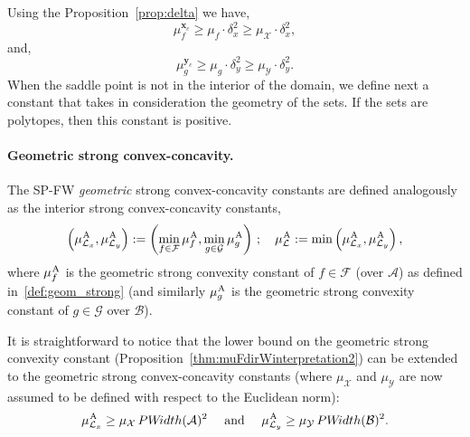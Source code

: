\documentclass[twoside]{article}
\renewcommand{\L}{\mathcal{L}}
\newcommand{\X}{\mathcal{X}}
\newcommand{\Y}{\mathcal{Y}}
\newcommand{\x}{\bm{x}}
\newcommand{\y}{\bm{y}}
\newcommand{\away}{{\hspace{0.05em}\textnormal{A}}}
\newcommand{\A}{\mathcal{A}}
\newcommand{\B}{\mathcal{B}}
\newcommand{\PWidth}{\mathop{PW\!idth}}
\newcommand{\xc}{\x_c} %
\newcommand{\yc}{\y_c} %
\newcommand{\0}{\mathbf{0}} %
\begin{document}
  \proof 
     Using the Proposition~\ref{prop:delta} we have, 
      \begin{equation}
        \mu^{\xc}_f \geq \mu_f \cdot \delta_x^2 \geq \mu_\X\cdot \delta_x^2,
      \end{equation}
     and,
        \begin{equation}
        \mu^{\yc}_g \geq \mu_g \cdot \delta_y^2 \geq \mu_\Y\cdot \delta_y^2.
      \end{equation}
  \endproof
  When the saddle point is not in the interior of the domain, we define next a constant that takes in consideration the geometry of the sets. If the sets are polytopes, then this constant is positive.
\paragraph{Geometric strong convex-concavity.} %
\label{par:geometric_strong_convex_concavity}
%
   The SP-FW \emph{geometric} strong convex-concavity constants are defined analogously as the interior strong convex-concavity constants,
    \begin{equation} 
  \label{def:geom_strongL}
      \left(\mu^{\away}_{\L_x}, \mu^{\away}_{\L_y}\right) := \left( \min_{f \in \mathcal F} \mu^{\away}_f,  \min_{g \in \mathcal G} \mu^{\away}_g \right) \, ; \quad \mu^{\away}_\L:=\min \left(\mu^{\away}_{\L_x}, \mu^{\away}_{\L_y}\right)  ,
    \end{equation}
    where $\mu^{\away}_f$ is the  geometric strong convexity constant of $f \in \mathcal F$ (over $\A$) as defined in~\eqref{def:geom_strong} (and similarly $\mu^{\away}_g$ is the geometric strong convexity constant of $g \in \mathcal G$ over $\B$).

  It is straightforward to notice that the lower bound on the geometric strong convexity constant (Proposition~\ref{thm:muFdirWinterpretation2}) can be extended to the geometric strong convex-concavity constants (where $\mu_\X$ and $\mu_\Y$ are now assumed to be defined with respect to the Euclidean norm): 
  \begin{equation} \label{eq:muAwayLInequality}
  \mu^{\away}_{\L_x} \geq \mu_\X \PWidth(\A)^2 \quad \text{ and } \quad \mu^{\away}_{\L_y} \geq \mu_\Y \PWidth(\B)^2 .
  \end{equation} 



\end{document}
